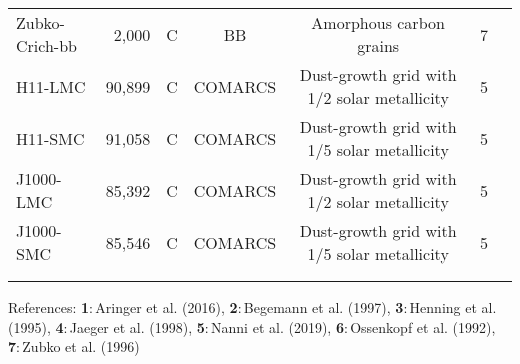 \documentclass[onecolumn]{aastex63}
\begin{document}
\begin{table*}
\begin{tabular}{ l r c c c c c}
    \vspace{0.1cm}
    Zubko-Crich-bb & 2,000 & C & BB & Amorphous carbon grains &  7\\
    \vspace{0.1cm}
    H11-LMC & 90,899 & C & COMARCS & Dust-growth grid with 1/2 solar metallicity &  5\\
    \vspace{0.1cm}
    H11-SMC & 91,058 & C & COMARCS & Dust-growth grid with 1/5 solar metallicity &  5\\
    \vspace{0.1cm}
    J1000-LMC & 85,392 & C & COMARCS & Dust-growth grid with 1/2 solar metallicity &  5\\
    \vspace{0.1cm}
    J1000-SMC & 85,546 & C & COMARCS & Dust-growth grid with 1/5 solar metallicity & 5\\
    \\
    \hline
    \vspace{-0.3cm}
    \end{tabular}
    \begin{flushleft}
    {{References}: \textbf{1}:\,Aringer et al. (2016), \textbf{2}:\,Begemann et al. (1997), \textbf{3}:\,Henning et al. (1995), \textbf{4}:\,Jaeger et al. (1998), \textbf{5}:\,Nanni et al. (2019), \textbf{6}:\,Ossenkopf et al. (1992), \textbf{7}:\,Zubko et al. (1996)}
    \end{flushleft}

\end{table*}

\thispagestyle{empty}
\end{document}
